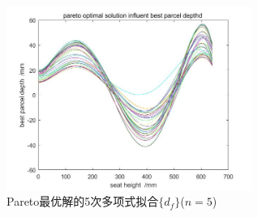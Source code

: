             \begin{figure}[H]
            \centering
            \includegraphics[width=8cm]{images/effect_pareto_df_2.jpg}
            \caption{Pareto最优解的5次多项式拟合$\{d_f \}$($n=5$)}
            \label{Pareto最优解的5次多项式拟合n为5时}
            \end{figure}

